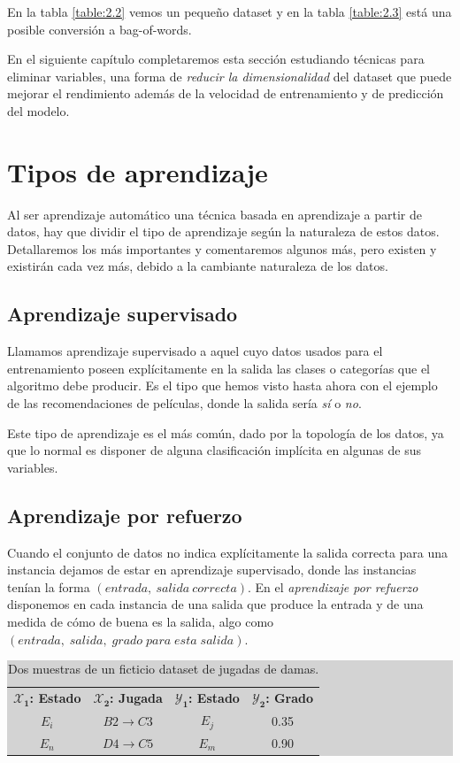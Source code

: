 En la tabla \ref{table:2.2} vemos un pequeño dataset y en la tabla \ref{table:2.3} está una posible conversión a bag-of-words.

En el siguiente capítulo completaremos esta sección estudiando técnicas para eliminar variables, una forma de \emph{reducir la dimensionalidad} del dataset que puede mejorar el rendimiento además de la velocidad de entrenamiento y de predicción del modelo.

\section{Tipos de aprendizaje} \label{sec:2.3}

Al ser aprendizaje automático una técnica basada en aprendizaje a partir de datos, hay que dividir el tipo de aprendizaje según la naturaleza de estos datos. Detallaremos los más importantes y comentaremos algunos más, pero existen y existirán cada vez más, debido a la cambiante naturaleza de los datos.

\subsection{Aprendizaje supervisado} \label{subsec:2.3.1}

Llamamos aprendizaje supervisado a aquel cuyo datos usados para el entrenamiento poseen explícitamente en la salida las clases o categorías que el algoritmo debe producir. Es el tipo que hemos visto hasta ahora con el ejemplo de las recomendaciones de películas, donde la salida sería \emph{sí} o \emph{no}.

Este tipo de aprendizaje es el más común, dado por la topología de los datos, ya que lo normal es disponer de alguna clasificación implícita en algunas de sus variables.

\subsection{Aprendizaje por refuerzo} \label{subsec:2.3.2}

Cuando el conjunto de datos no indica explícitamente la salida correcta para una instancia dejamos de estar en aprendizaje supervisado, donde las instancias tenían la forma $(entrada,\:salida\:correcta)$. En el \emph{aprendizaje por refuerzo} disponemos en cada instancia de una salida que produce la entrada y de una medida de cómo de buena es la salida, algo como $(entrada,\;salida,\;grado\;para\;esta\;salida)$.

\begin{table}[ht]
\centering
\colorbox{lightgray}{\begin{tabular}{*{2}{c} | *{2}{c}} 
  $\mathbf{\mathcal{X}_{1}}$\textbf{: Estado} & $\mathbf{\mathcal{X}_{2}}$\textbf{: Jugada} & $\mathbf{\mathcal{Y}_{1}}$\textbf{: Estado} & $\mathbf{\mathcal{Y}_{2}}$\textbf{: Grado} \\
  $E_{i}$ & $B2 \rightarrow C3$ & $E_{j}$ & 0.35 \\
  $E_{n}$ & $D4 \rightarrow C5$ & $E_{m}$ & 0.90
\end{tabular}}
\caption{Dos muestras de un ficticio dataset de jugadas de damas.}
\label{table:2.4}
\end{table}

